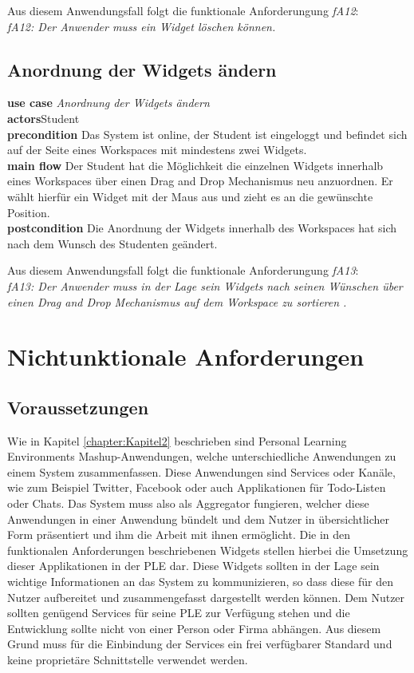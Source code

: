 Aus diesem Anwendungsfall folgt die funktionale Anforderungung \emph{fA12}:\\
\emph{fA12: Der Anwender muss ein Widget löschen können.}\\
 
\subsection{Anordnung der Widgets ändern}
\textbf{use case} \emph{Anordnung der Widgets ändern}\\
\textbf{actors}Student\\
\textbf{precondition} Das System ist online, der Student ist eingeloggt und befindet sich auf der Seite eines Workspaces mit mindestens zwei Widgets.\\
\textbf{main flow} Der Student hat die Möglichkeit die einzelnen Widgets innerhalb eines Workspaces über einen Drag and Drop Mechanismus neu anzuordnen. Er wählt hierfür ein Widget mit der Maus aus und zieht es an die gewünschte Position.\\
\textbf{postcondition} Die Anordnung der Widgets innerhalb des Workspaces hat sich nach dem Wunsch des Studenten geändert.
 
Aus diesem Anwendungsfall folgt die funktionale Anforderungung \emph{fA13}:\\
\emph{fA13: Der Anwender muss in der Lage sein Widgets nach seinen Wünschen über einen Drag and Drop Mechanismus auf dem Workspace zu sortieren .}\\
 
\section{Nichtunktionale Anforderungen}\label{section:nichtfunktionale_anforderunge}

\subsection{Voraussetzungen}
Wie in Kapitel \ref{chapter:Kapitel2} beschrieben sind Personal Learning Environments Mashup-Anwendungen, welche unterschiedliche Anwendungen zu einem System zusammenfassen. Diese Anwendungen sind Services oder Kanäle, wie zum Beispiel Twitter, Facebook oder auch Applikationen für Todo-Listen oder Chats. Das System muss also als Aggregator fungieren, welcher diese Anwendungen in einer Anwendung bündelt und dem Nutzer in übersichtlicher Form präsentiert und ihm die Arbeit mit ihnen ermöglicht. Die in den funktionalen Anforderungen beschriebenen Widgets stellen hierbei die Umsetzung dieser Applikationen in der PLE dar. Diese Widgets sollten in der Lage sein wichtige Informationen an das System zu kommunizieren, so dass diese für den Nutzer aufbereitet und zusammengefasst dargestellt werden können. Dem Nutzer sollten genügend Services für seine PLE zur Verfügung stehen und die Entwicklung sollte nicht von einer Person oder Firma abhängen. Aus diesem Grund muss für die Einbindung der Services ein frei verfügbarer Standard und keine proprietäre Schnittstelle verwendet werden.


